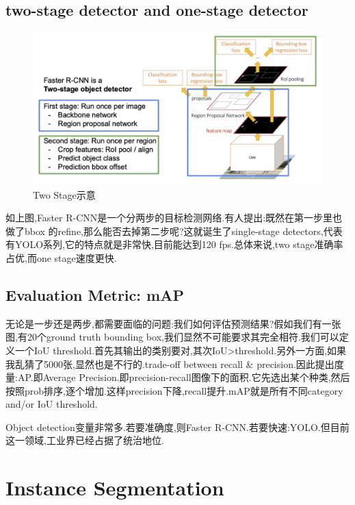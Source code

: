 	\subsection{two-stage detector and one-stage detector}
	\begin{figure}[htbp]
		\centering
		\includegraphics[scale=0.45]{figures/two_stage_detector.png}
		\caption{Two Stage示意}
		\label{}
	\end{figure}
	
	如上图,Faster R-CNN是一个分两步的目标检测网络.有人提出:既然在第一步里也做了bbox 的refine,那么能否去掉第二步呢?这就诞生了single-stage detectors,代表有YOLO系列,它的特点就是非常快,目前能达到120 fps.总体来说,two stage准确率占优,而one stage速度更快.
	
	\subsection{Evaluation Metric: mAP}
	
	无论是一步还是两步,都需要面临的问题:我们如何评估预测结果?假如我们有一张图,有20个ground truth bounding box,我们显然不可能要求其完全相符.我们可以定义一个IoU threshold.首先其输出的类别要对,其次IoU>threshold.另外一方面,如果我乱猜了5000张,显然也是不行的.trade-off between recall \& precision.因此提出度量:AP.即Average Precision.即precision-recall图像下的面积.它先选出某个种类,然后按照prob排序,逐个增加.这样precision下降,recall提升.mAP就是所有不同category and/or IoU threshold.
	
	Object detection变量非常多.若要准确度,则Faster R-CNN.若要快速:YOLO.但目前这一领域,工业界已经占据了统治地位.
	
	
	\clearpage
	\section{Instance Segmentation}
	
